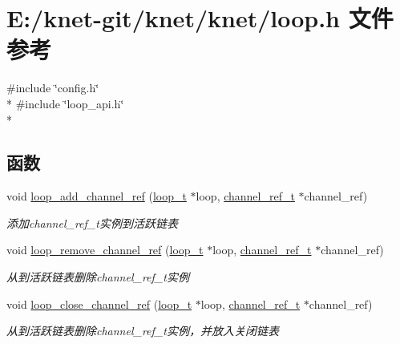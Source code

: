 \hypertarget{a00070}{}\section{E\+:/knet-\/git/knet/knet/loop.h 文件参考}
\label{a00070}
{\ttfamily \#include \char`\"{}config.\+h\char`\"{}}\\*
{\ttfamily \#include \char`\"{}loop\+\_\+api.\+h\char`\"{}}\\*
\subsection*{函数}
\begin{DoxyCompactItemize}
\item 
void \hyperlink{a00070_ab4f4cfdde0b598a3e8267a5ff60775ec_ab4f4cfdde0b598a3e8267a5ff60775ec}{loop\+\_\+add\+\_\+channel\+\_\+ref} (\hyperlink{a00051_a9c3ad1cd2de83e09f3a7b59fa82c94ee_a9c3ad1cd2de83e09f3a7b59fa82c94ee}{loop\+\_\+t} $\ast$loop, \hyperlink{a00051_a151271c9d188ef28d4d24bb81dcc1263_a151271c9d188ef28d4d24bb81dcc1263}{channel\+\_\+ref\+\_\+t} $\ast$channel\+\_\+ref)
\begin{DoxyCompactList}\small\item\em 添加channel\+\_\+ref\+\_\+t实例到活跃链表 \end{DoxyCompactList}\item 
void \hyperlink{a00070_a074c9c3a80a8a5c57b831e41395d4ef5_a074c9c3a80a8a5c57b831e41395d4ef5}{loop\+\_\+remove\+\_\+channel\+\_\+ref} (\hyperlink{a00051_a9c3ad1cd2de83e09f3a7b59fa82c94ee_a9c3ad1cd2de83e09f3a7b59fa82c94ee}{loop\+\_\+t} $\ast$loop, \hyperlink{a00051_a151271c9d188ef28d4d24bb81dcc1263_a151271c9d188ef28d4d24bb81dcc1263}{channel\+\_\+ref\+\_\+t} $\ast$channel\+\_\+ref)
\begin{DoxyCompactList}\small\item\em 从到活跃链表删除channel\+\_\+ref\+\_\+t实例 \end{DoxyCompactList}\item 
void \hyperlink{a00070_a9328cf8ba2faccbf363b41e524631b75_a9328cf8ba2faccbf363b41e524631b75}{loop\+\_\+close\+\_\+channel\+\_\+ref} (\hyperlink{a00051_a9c3ad1cd2de83e09f3a7b59fa82c94ee_a9c3ad1cd2de83e09f3a7b59fa82c94ee}{loop\+\_\+t} $\ast$loop, \hyperlink{a00051_a151271c9d188ef28d4d24bb81dcc1263_a151271c9d188ef28d4d24bb81dcc1263}{channel\+\_\+ref\+\_\+t} $\ast$channel\+\_\+ref)
\begin{DoxyCompactList}\small\item\em 从到活跃链表删除channel\+\_\+ref\+\_\+t实例，并放入关闭链表 \end{DoxyCompactList}\item 

\end{DoxyCompactItemize}
